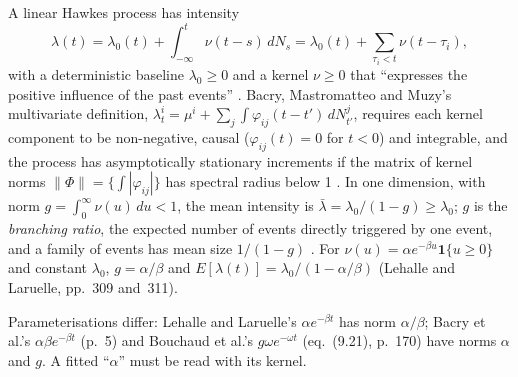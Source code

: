 \begin{qfmodel}\label{mod:hawkes-order-flow}
 A linear Hawkes process has intensity
\[ \lambda(t)=\lambda_0(t)+\int_{-\infty}^t\nu(t-s)\,dN_s=\lambda_0(t)+\sum_{\tau_i<t}\nu(t-\tau_i), \]
with a deterministic baseline $\lambda_0\ge0$ and a kernel $\nu\ge0$ that ``expresses the positive influence of the past events'' \citep[app.~A, sec.~A.12.2, Definition~7, p.~308]{alpha-laruelle}. Bacry, Mastromatteo and Muzy's multivariate definition, $\lambda^i_t=\mu^i+\sum_j\int\varphi_{ij}(t-t')\,dN^j_{t'}$, requires each kernel component to be non-negative, causal ($\varphi_{ij}(t)=0$ for $t<0$) and integrable, and the process has asymptotically stationary increments if the matrix of kernel norms $\|\Phi\|=\{\int|\varphi_{ij}|\}$ has spectral radius below 1 \citep[arXiv v2, sec.~2.1, Definition~1 and Proposition~1, pp.~3--4]{wide-bacry-hawkes}. In one dimension, with norm $g=\int_0^\infty\nu(u)\,du<1$, the mean intensity is $\bar\lambda=\lambda_0/(1-g)\ge\lambda_0$; $g$ is the \emph{branching ratio}, the expected number of events directly triggered by one event, and a family of events has mean size $1/(1-g)$ \citep[chap.~9, secs.~9.2.2 and~9.2.6, pp.~167--168 and~172]{catalogue-0528}. For $\nu(u)=\alpha e^{-\beta u}\mathbf 1\{u\ge0\}$ and constant $\lambda_0$, $g=\alpha/\beta$ and $E[\lambda(t)]=\lambda_0/(1-\alpha/\beta)$ (Lehalle and Laruelle, pp.~309 and~311).

 Parameterisations differ: Lehalle and Laruelle's $\alpha e^{-\beta t}$ has norm $\alpha/\beta$; Bacry et al.'s $\alpha\beta e^{-\beta t}$ (p.~5) and Bouchaud et al.'s $g\omega e^{-\omega t}$ (eq.~(9.21), p.~170) have norms $\alpha$ and $g$. A fitted ``$\alpha$'' must be read with its kernel.


\end{qfmodel}

